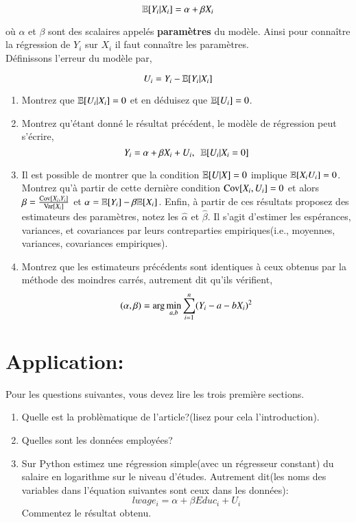 \[\mathbb{E}[Y_i|X_i] = \alpha + \beta X_i\]

où $\alpha$ et $\beta$ sont des scalaires appelés \textbf{paramètres} du modèle. Ainsi pour connaître la régression de $Y_i$ sur $X_i$ il faut connaître les paramètres.\\

Définissons l'erreur du modèle par,

\[U_i = Y_i - \mathbb{E}[Y_i|X_i]\]

\begin{enumerate}
\item Montrez que $\mathbb{E}[U_i|X_i] = 0$ et en déduisez que $\mathbb{E}[U_i] = 0$.
\item Montrez qu'étant donné le résultat précédent, le modèle de régression peut s'écrire,
\[Y_i = \alpha + \beta X_i + U_i, \ \ \mathbb{E}[U_i| X_i = 0]\]
\item Il est possible de montrer que la condition $\mathbb{E}[U|X] = 0$
  implique $\mathbb{E}[X_iU_i] = 0$. Montrez qu'à partir de cette dernière
  condition $\operatorname{Cov}[X_i, U_i] = 0$ et alors $\beta = \frac{\operatorname{Cov}[X_i,
    Y_i]}{\operatorname{Var}[X_i]}$ et $\alpha = \mathbb{E}[Y_i] - \beta\mathbb{E}[X_i]$. Enfin, à
  partir de ces résultats proposez des estimateurs des paramètres,
  notez les $\widehat{\alpha}$ et $\widehat{\beta}$. Il s'agit d'estimer les espérances, variances, et covariances par leurs contreparties empiriques(i.e., moyennes, variances, covariances empiriques).
\item Montrez que les estimateurs précédents sont identiques à ceux
  obtenus par la méthode des moindres carrés, autrement dit qu'ils
  vérifient,
\[(\alpha, \beta) = \arg\min_{a, b}\sum_{i=1}^n(Y_i - a -
  bX_i)^2\]


\end{enumerate}

\section{Application: \cite{card1993}}
Pour les questions suivantes, vous devez lire les trois première sections.
\begin{enumerate}
\item Quelle est la problèmatique de l'article?(lisez pour cela l'introduction).
\item Quelles sont les données employées?
\item Sur Python estimez une régression simple(avec un régresseur constant) du salaire en logarithme sur le niveau d'études. Autrement dit(les noms des variables dans l'équation suivantes sont ceux dans les données):
\[
lwage_i = \alpha + \beta Educ_i + U_i
\]
Commentez le résultat obtenu. 
\end{enumerate}

